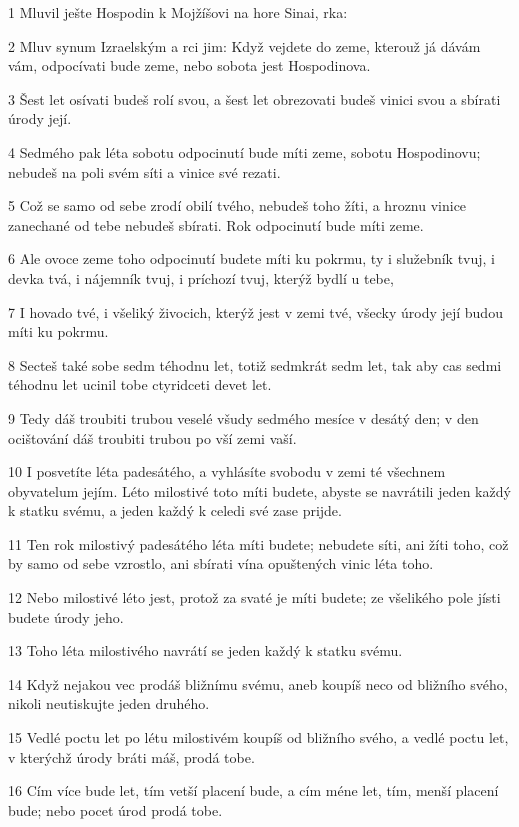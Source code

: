 \par 1 Mluvil ješte Hospodin k Mojžíšovi na hore Sinai, rka:
\par 2 Mluv synum Izraelským a rci jim: Když vejdete do zeme, kterouž já dávám vám, odpocívati bude zeme, nebo sobota jest Hospodinova.
\par 3 Šest let osívati budeš rolí svou, a šest let obrezovati budeš vinici svou a sbírati úrody její.
\par 4 Sedmého pak léta sobotu odpocinutí bude míti zeme, sobotu Hospodinovu; nebudeš na poli svém síti a vinice své rezati.
\par 5 Což se samo od sebe zrodí obilí tvého, nebudeš toho žíti, a hroznu vinice zanechané od tebe nebudeš sbírati. Rok odpocinutí bude míti zeme.
\par 6 Ale ovoce zeme toho odpocinutí budete míti ku pokrmu, ty i služebník tvuj, i devka tvá, i nájemník tvuj, i príchozí tvuj, kterýž bydlí u tebe,
\par 7 I hovado tvé, i všeliký živocich, kterýž jest v zemi tvé, všecky úrody její budou míti ku pokrmu.
\par 8 Secteš také sobe sedm téhodnu let, totiž sedmkrát sedm let, tak aby cas sedmi téhodnu let ucinil tobe ctyridceti devet let.
\par 9 Tedy dáš troubiti trubou veselé všudy sedmého mesíce v desátý den; v den ocištování dáš troubiti trubou po vší zemi vaší.
\par 10 I posvetíte léta padesátého, a vyhlásíte svobodu v zemi té všechnem obyvatelum jejím. Léto milostivé toto míti budete, abyste se navrátili jeden každý k statku svému, a jeden každý k celedi své zase prijde.
\par 11 Ten rok milostivý padesátého léta míti budete; nebudete síti, ani žíti toho, což by samo od sebe vzrostlo, ani sbírati vína opuštených vinic léta toho.
\par 12 Nebo milostivé léto jest, protož za svaté je míti budete; ze všelikého pole jísti budete úrody jeho.
\par 13 Toho léta milostivého navrátí se jeden každý k statku svému.
\par 14 Když nejakou vec prodáš bližnímu svému, aneb koupíš neco od bližního svého, nikoli neutiskujte jeden druhého.
\par 15 Vedlé poctu let po létu milostivém koupíš od bližního svého, a vedlé poctu let, v kterýchž úrody bráti máš, prodá tobe.
\par 16 Cím více bude let, tím vetší placení bude, a cím méne let, tím, menší placení bude; nebo pocet úrod prodá tobe.
